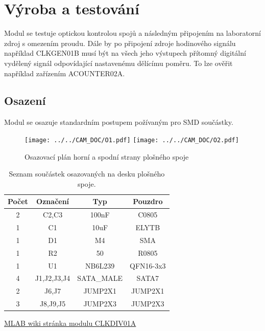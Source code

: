 \documentclass[12pt,a4paper,oneside]{article}
\begin{document}
\section{Výroba a testování}

Modul se testuje optickou kontrolou spojů a následným připojením na laboratorní zdroj s omezením proudu. Dále by po připojení zdroje hodinového signálu například CLKGEN01B musí být na všech jeho výstupech přítomný digitální vydělený signál odpovídající nastavenému dělícímu poměru. To lze ověřit například zařízením ACOUNTER02A.

\subsection{Osazení}

Modul se osazuje standardním postupem požívaným pro SMD součástky.

\begin{figure} [h!tbp]
  \centering
  \texttt{[image: ../../CAM\_DOC/O1.pdf]}
  \texttt{[image: ../../CAM\_DOC/O2.pdf]}
  \caption{Osazovací plán horní a spodní strany plošného spoje}
  \label{fig:osazovaci_plan}
\end{figure}

\begin{savenotes}
\begin{table}[h!]
\begin{center}
\begin{tabular}{ |c|c|c|c| }
\hline 
Počet & Označení & Typ  & Pouzdro  \\ 
\hline 
2	&	C2,C3	&	100nF	&	C0805	\\
1	&	C1	&	10uF	&	ELYTB	\\
1	&	D1	&	M4	&	SMA	\\
1	&	R2	&	50	&	R0805	\\
1	&	U1	&	NB6L239	&	QFN16-3x3	\\
4	&	J1,J2,J3,J4	&	SATA\_MALE	&	SATA7	\\
2	&	J6,J7	&	JUMP2X1	&	JUMP2X1	\\
3	&	J8,J9,J5	&	JUMP2X3	&	JUMP2X3	\\
\hline 
\end{tabular}
\end{center}
\caption{Seznam součástek osazovaných na desku plošného spoje.}
\label{seznam_soucastek_galvanic_isolation}
\end{table}
\end{savenotes}

\begin{thebibliography}{99}
\href{http://wiki.mlab.cz/doku.php?id=cs:clkdiv}{MLAB wiki stránka modulu CLKDIV01A}

\end{thebibliography}
\end{document}
